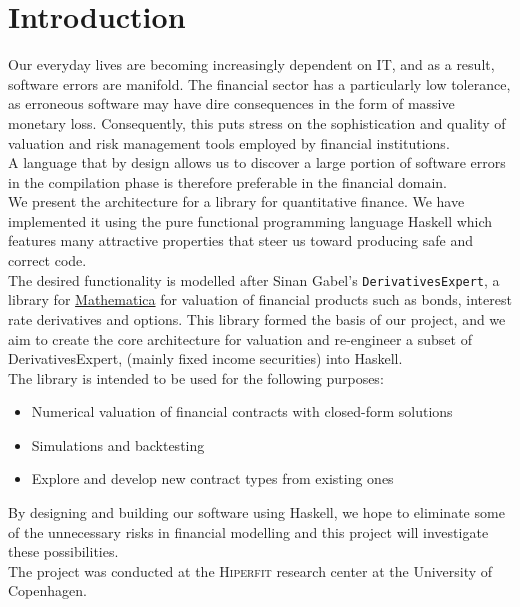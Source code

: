 \chapter{Introduction}

Our everyday lives are becoming increasingly dependent on IT, and as a result,
software errors are manifold. The financial sector has a particularly low 
tolerance, as erroneous software may have dire consequences in the form of
massive monetary loss. Consequently, this puts stress on the sophistication and 
quality of valuation and risk management tools employed by financial institutions.\\
A language that by design allows us to discover a large portion of software
errors in the compilation phase is therefore preferable in the financial domain.\\

We present the architecture for a library for quantitative finance. We have
implemented it using the pure functional programming language Haskell which
features many attractive properties that steer us toward producing safe and
correct code.\\

The desired functionality is modelled after Sinan Gabel's 
\texttt{DerivativesExpert}\cite{Mathematica:DerivativesExpert},
a library for \href{http://www.wolfram.com/mathematica/}{Mathematica}
for valuation of financial products such as bonds, interest rate derivatives 
and options. This library formed the basis of our project, and we aim to create
the core architecture for valuation and re-engineer a subset of DerivativesExpert, 
(mainly fixed income securities) into Haskell.\\

The library is intended to be used for the following purposes:

\begin{itemize}
\item Numerical valuation of financial contracts with closed-form solutions
\item Simulations and backtesting
\item Explore and develop new contract types from existing ones
\end{itemize}

By designing and building our software using Haskell, we hope to eliminate 
some of the unnecessary risks in financial modelling and this project
will investigate these possibilities.\\

The project was conducted at the \textsc{Hiperfit} research center at the
University of Copenhagen.
